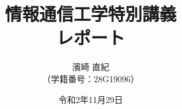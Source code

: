 \documentclass[11pt,a4paper]{jsarticle}
\title{\Huge 情報通信工学特別講義\\\huge レポート\vspace{109mm}}
\author{\Large 濱崎 直紀\\\large （学籍番号：28G19096）\vspace{23mm}}
\date{令和2年11月29日}
\begin{document}
\begin{titlepage}
\maketitle
\thispagestyle{empty}
\end{titlepage}

\pagestyle{empty}


\end{document}
